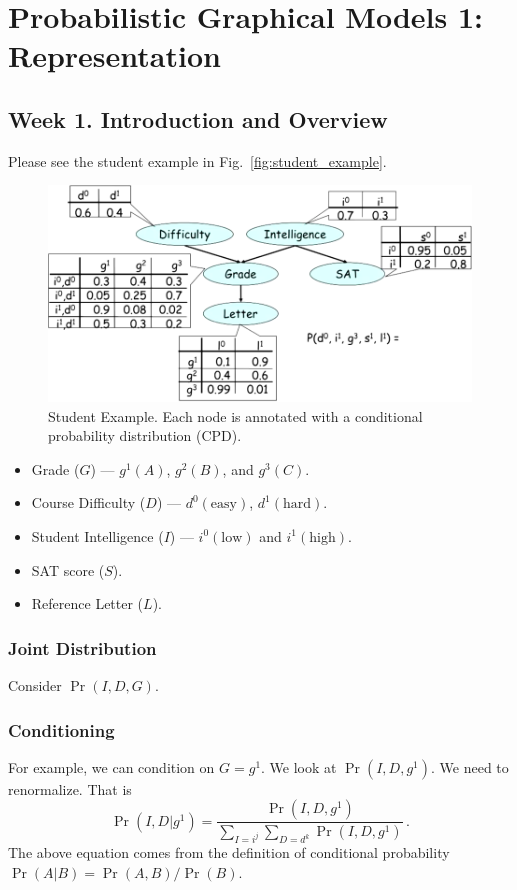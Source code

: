 \documentclass[12pt]{article}
\begin{document}
\section{Probabilistic Graphical Models 1: Representation}

\subsection{Week 1. Introduction and Overview}

Please see the student example in Fig.~\ref{fig:student_example}.

\begin{figure}[H]
\centering
\includegraphics[width=6.5in]{graphics/example_student.png}
\caption{Student Example. Each node is annotated with a conditional probability distribution (CPD).}
\label{fig:example_student}
\end{figure}


\begin{itemize}
    \item Grade ($G$) --- $g^1(A)$, $g^2(B)$, and $g^3(C)$.
    \item Course Difficulty ($D$) --- $d^0(\text{easy})$, $d^1(\text{hard})$.
    \item Student Intelligence ($I$) --- $i^0(\text{low})$ and $i^1(\text{high})$.
    \item SAT score ($S$).
    \item Reference Letter ($L$).
\end{itemize}
 



\subsubsection{Joint Distribution}
Consider $\Pr(I, D, G)$.

\subsubsection{Conditioning}
For example, we can condition on $G=g^1$.  We look at $\Pr(I, D, g^1)$.
We need to renormalize. That is
\begin{equation*}
  \Pr(I, D | g^1) = \frac{\Pr(I, D, g^1)}
                         {\sum_{I=i^j} \sum_{D=d^k} \Pr(I, D, g^1)}  \, .
\end{equation*}
The above equation comes from the definition of conditional probability $\Pr(A | B) = \Pr(A, B) / \Pr(B)$.
\end{document}
